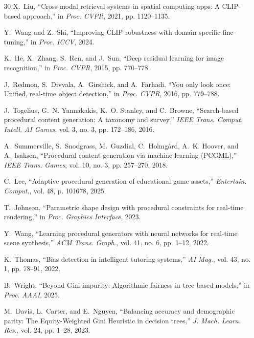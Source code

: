 \documentclass[conference]{IEEEtran}
\begin{document}
\begin{thebibliography}{30}
X.~Liu, ``Cross-modal retrieval systems in spatial computing apps: A CLIP-based approach,'' in \textit{Proc. CVPR}, 2021, pp. 1120--1135.

Y.~Wang and Z.~Shi, ``Improving CLIP robustness with domain-specific fine-tuning,'' in \textit{Proc. ICCV}, 2024.

K.~He, X.~Zhang, S.~Ren, and J.~Sun, ``Deep residual learning for image recognition,'' in \textit{Proc. CVPR}, 2015, pp. 770--778.

J.~Redmon, S.~Divvala, A.~Girshick, and A.~Farhadi, ``You only look once: Unified, real-time object detection,'' in \textit{Proc. CVPR}, 2016, pp. 779--788.

J.~Togelius, G.~N. Yannakakis, K.~O. Stanley, and C.~Browne, ``Search-based procedural content generation: A taxonomy and survey,'' \textit{IEEE Trans. Comput. Intell. AI Games}, vol. 3, no. 3, pp. 172--186, 2016.

A.~Summerville, S.~Snodgrass, M.~Guzdial, C.~Holmgård, A.~K. Hoover, and A.~Isaksen, ``Procedural content generation via machine learning (PCGML),'' \textit{IEEE Trans. Games}, vol. 10, no. 3, pp. 257--270, 2018.

C.~Lee, ``Adaptive procedural generation of educational game assets,'' \textit{Entertain. Comput.}, vol. 48, p. 101678, 2025.

T.~Johnson, ``Parametric shape design with procedural constraints for real-time rendering,'' in \textit{Proc. Graphics Interface}, 2023.

Y.~Wang, ``Learning procedural generators with neural networks for real-time scene synthesis,'' \textit{ACM Trans. Graph.}, vol. 41, no. 6, pp. 1--12, 2022.

K.~Thomas, ``Bias detection in intelligent tutoring systems,'' \textit{AI Mag.}, vol. 43, no. 1, pp. 78--91, 2022.

B.~Wright, ``Beyond Gini impurity: Algorithmic fairness in tree-based models,'' in \textit{Proc. AAAI}, 2025.

M.~Davis, L.~Carter, and E.~Nguyen, ``Balancing accuracy and demographic parity: The Equity-Weighted Gini Heuristic in decision trees,'' \textit{J. Mach. Learn. Res.}, vol. 24, pp. 1--28, 2023.


\end{thebibliography}
\end{document}
